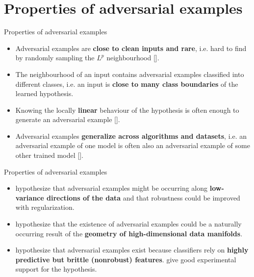 \documentclass{beamer}
\newcommand{\citet}[1]{{\color{citecolor}\relscale{0.8}\textcite{#1}}}
\newcommand{\citep}[1]{{\color{citecolor}\relscale{0.8}[\textcite{#1}]}}
\begin{document}
\section{Properties of adversarial examples}

\begin{frame}[allowframebreaks=0.9]{Properties of adversarial examples}
	\begin{itemize}
		\item Adversarial examples are \textbf{close to clean inputs and rare}, i.e. hard to find by randomly sampling the $L^p$ neighbourhood \citep{Szegedy:2013:IPNN}.    
		\item The neighbourhood of an input contains adversarial examples classified into different classes, i.e. an input is \textbf{close to many class boundaries} of the learned hypothesis.
		\item Knowing the locally \textbf{linear} behaviour of the hypothesis is often enough to generate an adversarial example \citep{Goodfellow:2014:EHAE}.
		\item Adversarial examples \textbf{generalize across algorithms and datasets}, i.e. an adversarial example of one model is often also an adversarial example of some other trained model \citep{Szegedy:2013:IPNN,Papernot:2016:TMLPBBAAS,Liu:2016:DTAEBBA,Tramer:2017:STAE}.
	\end{itemize}
\end{frame}

\begin{frame}[allowframebreaks=0.9]{Properties of adversarial examples}
	\begin{itemize}
		\item \citet{Tanay:2016:ABTPPAE} hypothesize that adversarial examples might be occurring along \textbf{low-variance directions of the data} and that robustness could be improved with regularization.
		\item \citet{Gilmer:2018:AS} hypothesize that the existence of adversarial examples could be a naturally occurring result of the \textbf{geometry of high-dimensional data manifolds}.
		\item \citet{Tsipras:2018:RMBOA,Ilyas:2019:AENBTF} hypothesize that adversarial examples exist because classifiers rely on \textbf{highly predictive but brittle (nonrobust) features}. \citet{Ilyas:2019:AENBTF} give good experimental support for the hypothesis.
	\end{itemize}
\end{frame}
\end{document}

